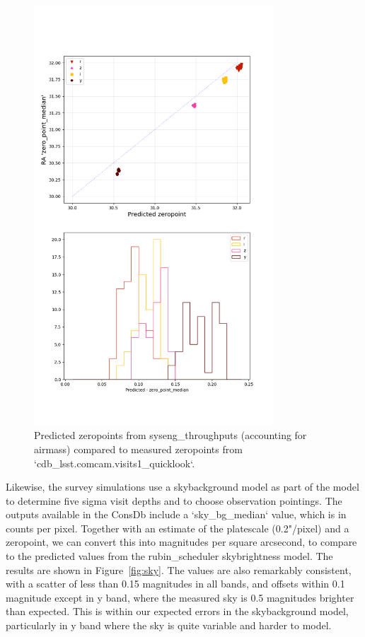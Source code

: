 \begin{figure}
    \centering
    \includegraphics[width=0.8\textwidth]{sp/zeropoints.png}
    \caption{Predicted zeropoints from syseng\_throughputs (accounting for airmass) compared to measured zeropoints from `cdb\_lsst.comcam.visits1\_quicklook`.}
    \label{fig:zeropoints}
    \end{figure}
    
    
    
Likewise, the survey simulations use a skybackground model as part of the model to determine five sigma visit depths and to choose observation pointings. The outputs available in the ConsDb include a `sky\_bg\_median` value, which is in counts per pixel. Together with an estimate of the platescale (0.2"/pixel) and a zeropoint, we can convert this into magnitudes per square arcsecond, to compare to the predicted values from the rubin\_scheduler skybrightness model. The results are shown in Figure~\ref{fig:sky}.  The values are also remarkably consistent, with a scatter of less than 0.15 magnitudes in all bands, and offsets within 0.1 magnitude except in y band, where the measured sky is 0.5 magnitudes brighter than expected. This is  within our expected errors in the skybackground model, particularly in y band where the sky is quite variable and harder to model. 

